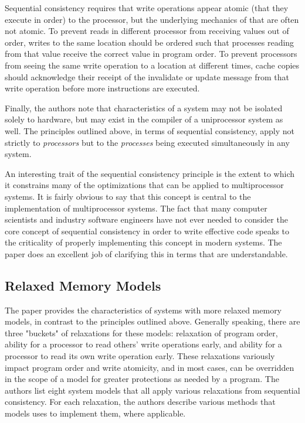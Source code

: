 \documentclass{article}
\begin{document}
\par Sequential consistency requires that write operations appear atomic (that they execute in order) to the processor, but the underlying mechanics of that are often not atomic.
To prevent reads in different processor from receiving values out of order, writes to the same location should be ordered such that processes reading from that value receive the correct value in program order.
To prevent processors from seeing the same write operation to a location at different times, cache copies should acknowledge their receipt of the invalidate or update message from that write operation before more instructions are executed.

\par Finally, the authors note that characteristics of a system may not be isolated solely to hardware, but may exist in the compiler of a uniprocessor system as well.
The principles outlined above, in terms of sequential consistency, apply not strictly to \textit{processors} but to the \textit{processes} being executed simultaneously in any system.

\par An interesting trait of the sequential consistency principle is the extent to which it constrains many of the optimizations that can be applied to multiprocessor systems.
It is fairly obvious to say that this concept is central to the implementation of multiprocessor systems.
The fact that many computer scientists and industry software engineers have not ever needed to consider the core concept of sequential consistency in order to write effective code speaks to the criticality of properly implementing this concept in modern systems.
The paper does an excellent job of clarifying this in terms that are understandable.

\subsection{Relaxed Memory Models}\label{relaxed}
\par The paper provides the characteristics of systems with more relaxed memory models, in contrast to the principles outlined above.
Generally speaking, there are three "buckets" of relaxations for these models: relaxation of program order, ability for a processor to read others' write operations early, and ability for a processor to read its own write operation early.
These relaxations variously impact program order and write atomicity, and in most cases, can be overridden in the scope of a model for greater protections as needed by a program.
The authors list eight system models that all apply various relaxations from sequential consistency.
For each relaxation, the authors describe various methods that models uses to implement them, where applicable.
\end{document}
